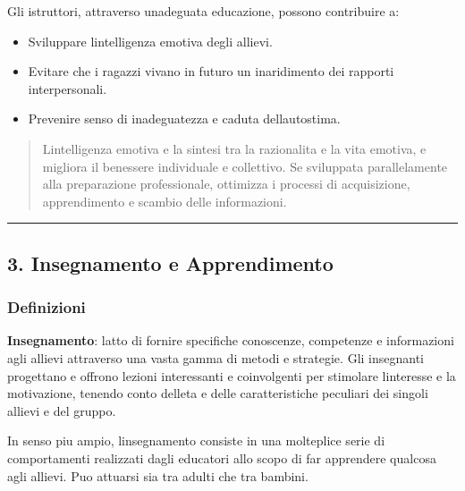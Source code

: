 \documentclass[a4paper,11pt]{article}
\providecommand{\tightlist}{%
  \setlength{\itemsep}{0pt}\setlength{\parskip}{0pt}}
\begin{document}
Gli istruttori, attraverso un\textquotesingle adeguata educazione,
possono contribuire a:

\begin{itemize}
      \tightlist
      \item
            Sviluppare l\textquotesingle intelligenza emotiva degli allievi.
      \item
            Evitare che i ragazzi vivano in futuro un inaridimento dei rapporti
            interpersonali.
      \item
            Prevenire senso di inadeguatezza e caduta
            dell\textquotesingle autostima.
\end{itemize}

\begin{quote}
      L\textquotesingle intelligenza emotiva e la sintesi tra la razionalita e
      la vita emotiva, e migliora il benessere individuale e collettivo. Se
      sviluppata parallelamente alla preparazione professionale, ottimizza i
      processi di acquisizione, apprendimento e scambio delle informazioni.
\end{quote}

\begin{center}\rule{0.5\linewidth}{0.5pt}\end{center}

\subsection{3. Insegnamento e
      Apprendimento}\label{insegnamento-e-apprendimento}

\subsubsection{Definizioni}\label{definizioni-1}

\textbf{Insegnamento}: l\textquotesingle atto di fornire specifiche
conoscenze, competenze e informazioni agli allievi attraverso una vasta
gamma di metodi e strategie. Gli insegnanti progettano e offrono lezioni
interessanti e coinvolgenti per stimolare l\textquotesingle interesse e
la motivazione, tenendo conto dell\textquotesingle eta e delle
caratteristiche peculiari dei singoli allievi e del gruppo.

In senso piu ampio, l\textquotesingle insegnamento consiste in una
molteplice serie di comportamenti realizzati dagli educatori allo scopo
di far apprendere qualcosa agli allievi. Puo attuarsi sia tra adulti che
tra bambini.
\end{document}
